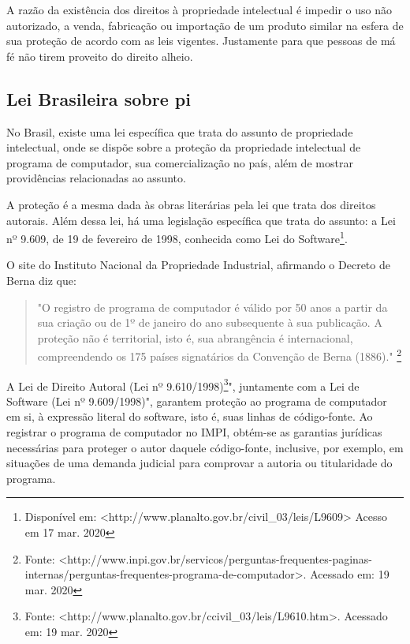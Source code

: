 A razão da existência dos direitos à propriedade intelectual é impedir o uso não autorizado, a venda, fabricação ou importação de um produto similar na esfera de sua proteção de acordo com as leis vigentes. Justamente para que pessoas de má fé não tirem proveito do direito alheio.


\subsection{Lei Brasileira sobre \ac{pi}} 
No Brasil, existe uma lei específica que trata do assunto de propriedade intelectual, onde se dispõe sobre a proteção da propriedade intelectual de programa de computador, sua comercialização no país, além de mostrar providências relacionadas ao assunto. 

A proteção  é a mesma dada às obras literárias pela lei que trata dos direitos autorais. Além dessa lei, há uma legislação específica que trata do assunto: a Lei nº 9.609, de 19 de fevereiro de 1998, conhecida como Lei do Software\footnote{Disponível em: <http://www.planalto.gov.br/civil\_03/leis/L9609> Acesso em 17 mar. 2020}. %

O site do Instituto Nacional da Propriedade Industrial, afirmando o Decreto de Berna \citep{leideBerna} diz que: 

\begin{quote}
    "O registro de programa de computador é válido por 50 anos a partir da sua criação ou de 1º de janeiro do ano subsequente à sua publicação. A proteção não é territorial, isto é, sua abrangência é internacional, compreendendo os 175 países signatários da Convenção de Berna (1886)." \footnote{Fonte: <http://www.inpi.gov.br/servicos/perguntas-frequentes-paginas-internas/perguntas-frequentes-programa-de-computador>. Acessado em: 19 mar. 2020} \citep{leideBerna}
\end{quote}


A Lei de Direito Autoral (Lei nº 9.610/1998)\footnote{Fonte: <http://www.planalto.gov.br/ccivil\_03/leis/L9610.htm>. Acessado em: 19 mar. 2020}", juntamente com a Lei de Software (Lei nº 9.609/1998)", garantem proteção ao programa de computador em si, à expressão literal do software, isto é, suas linhas de código-fonte. Ao registrar o programa de computador no IMPI, obtém-se as garantias jurídicas necessárias para proteger o autor daquele código-fonte, inclusive, por exemplo, em situações de uma demanda judicial para comprovar a autoria ou titularidade do programa.

